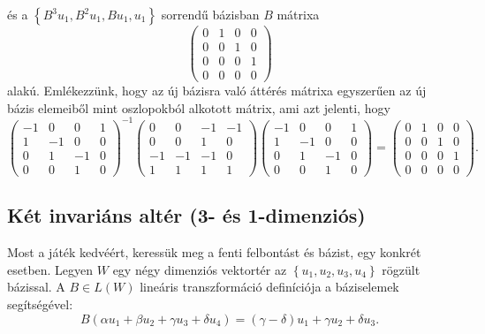 \documentclass[9pt, a4paper, showtrims]{memoir}
\theoremstyle{plain}
\theoremstyle{remark}
\theoremstyle{definition}
\begin{document}
és a $\left\{ B^3u_1,B^2u_1,Bu_1,u_1 \right\}$ sorrendű bázisban $B$ mátrixa
\[
	\begin{pmatrix}
		0 & 1 & 0 & 0 \\
		0 & 0 & 1 & 0 \\
		0 & 0 & 0 & 1 \\
		0 & 0 & 0 & 0
	\end{pmatrix}
\]
alakú.
Emlékezzünk, hogy az új bázisra való áttérés mátrixa egyszerűen az új bázis
elemeiből mint oszlopokból alkotott mátrix, ami azt jelenti, hogy
\[
	\begin{pmatrix}
		-1 & 0  & 0  & 1 \\
		1  & -1 & 0  & 0 \\
		0  & 1  & -1 & 0 \\
		0  & 0  & 1  & 0
	\end{pmatrix}^{-1}
	\begin{pmatrix}
		0  & 0  & -1 & -1 \\
		0  & 0  & 1  & 0  \\
		-1 & -1 & -1 & 0  \\
		1  & 1  & 1  & 1
	\end{pmatrix}
	\begin{pmatrix}
		-1 & 0  & 0  & 1 \\
		1  & -1 & 0  & 0 \\
		0  & 1  & -1 & 0 \\
		0  & 0  & 1  & 0
	\end{pmatrix}
	=
	\begin{pmatrix}
		0 & 1 & 0 & 0 \\
		0 & 0 & 1 & 0 \\
		0 & 0 & 0 & 1 \\
		0 & 0 & 0 & 0
	\end{pmatrix}.
\]
\subsection{Két invariáns altér (3- és 1-dimenziós)}
Most a játék kedvéért, keressük meg a fenti  felbontást és bázist, egy konkrét esetben.
Legyen $W$ egy négy dimenziós vektortér az $\left\{ u_1,u_2,u_3,u_4 \right\}$ rögzült bázissal.
A $B\in L\left( W \right)$ lineáris transzformáció definíciója a báziselemek segítségével:
\[
	B\left( \alpha u_1+\beta u_2 +\gamma u_3+\delta u_4 \right)
	=
	\left( \gamma-\delta \right)u_1+
	\gamma u_2+
	\delta u_3.
\]
\end{document}
